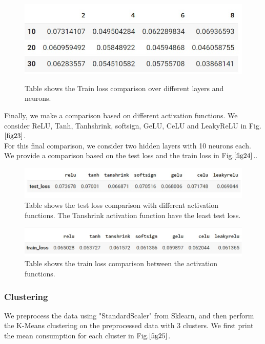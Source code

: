 \documentclass[english,12pt, titlepage]{article}
\begin{document}
	
	\begin{figure}[!ht]
		\centering
		\includegraphics[width=0.7\linewidth]{fig14.jpeg}
		\label{fig22}
		\caption{Table shows the Train loss comparison over different layers and neurons.}
	\end{figure}
	
	
	Finally, we make a comparison based on different activation functions. We consider ReLU, Tanh, Tanhshrink, softsign, GeLU, CeLU and LeakyReLU in Fig.$\ref{fig23}$. \\
	For this final comparison, we consider two hidden layers with 10 neurons each.\\
	We provide a comparison based on the test loss and the train loss in Fig.$\ref{fig24}$..
	
	
	\begin{figure}[!ht]
		\centering
		\includegraphics[width=0.8\linewidth]{fig15.jpeg}
		\caption{Table shows the test loss comparison with different activation functions. The Tanshrink activation function have the least test loss.}	\label{fig23}
	\end{figure}
	
	
	\begin{figure}[!ht]
		\centering
		\includegraphics[width=0.8\linewidth]{fig16.jpeg}
		\caption{Table shows the train loss comparison between the activation functions.}\label{fig24}
	\end{figure}
	
	
	\subsubsection{Clustering}
	We preprocess the data using "StandardScaler" from Sklearn, and then perform the K-Means clustering on the preprocessed data with 3 clusters.  We first print the mean consumption for each cluster in Fig.$\ref{fig25}$.
	
\end{document}

